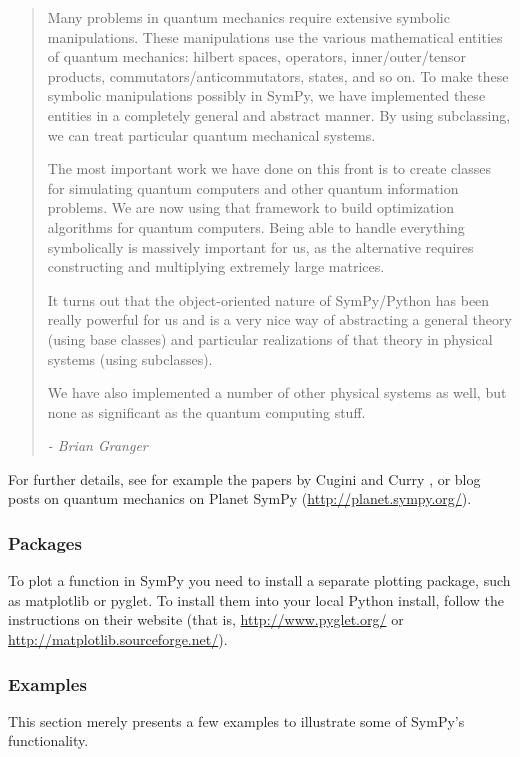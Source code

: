 \documentclass[12pt]{article}
\begin{document}
\begin{quotation}
Many problems in quantum mechanics require extensive symbolic
manipulations.  These manipulations use the various mathematical
entities of quantum mechanics:  hilbert spaces, operators,
inner/outer/tensor products, commutators/anticommutators, states,
and so on.  To make these symbolic manipulations possibly in SymPy, we have
implemented these entities in a completely general and abstract
manner.  By using subclassing, we can treat particular quantum
mechanical systems.

The most important work we have done on this front is to create
classes for simulating quantum computers and other quantum information
problems.  We are now using that framework to build optimization
algorithms for quantum computers.  Being able to handle everything
symbolically is massively important for us, as the alternative
requires constructing and multiplying extremely large matrices.

It turns out that the object-oriented nature of SymPy/Python has been
really powerful for us and is a very nice way of abstracting a general
theory (using base classes) and particular realizations of that theory in
physical systems (using subclasses).

We have also implemented a number of other physical systems as well,
but none as significant as the quantum computing stuff.

{\em - Brian Granger}
\end{quotation}

For further details, see for example the papers by Cugini \cite{Cug}
and Curry \cite{Cur}, or blog posts on quantum mechanics on 
Planet SymPy (\url{http://planet.sympy.org/}).

\subsubsection{Packages}

To plot a function in SymPy you need to install a separate plotting
package, such as matplotlib or pyglet.
To install them into your local Python install, follow the
instructions on their website (that is,
\url{http://www.pyglet.org/} or
\url{http://matplotlib.sourceforge.net/}).

\subsubsection{Examples}

This section merely presents a few examples to illustrate some of 
SymPy's functionality.
\end{document}
